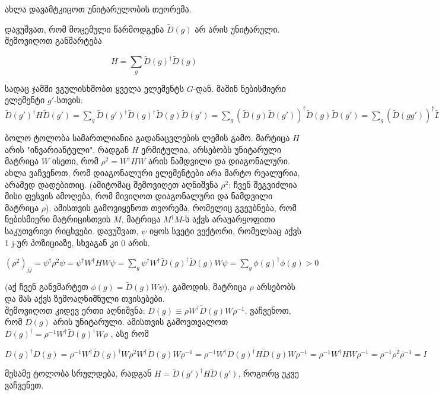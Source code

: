 \documentclass[12pt]{article}
\begin{document}
\begin{sloppypar}
ახლა დავამტკიცოთ უნიტარულობის თეორემა. 

დავუშვათ, რომ მოცემული წარმოდგენა $\widetilde D(g)$ არ არის უნიტარული. შემოვიღოთ განმარტება 

$$H = \sum_{g} \widetilde D(g)^{\dagger} \widetilde D(g) $$

\sloppy სადაც ჯამში ვგულისხმობთ ყველა ელემენტს $G$-დან. მაშინ ნებისმიერი ელემენტი $g'$-სთვის: 
$
 \widetilde D(g')^{\dagger} H \widetilde D(g') = 
 \sum_{g} \widetilde D(g')^{\dagger} \widetilde D(g)^{\dagger} \widetilde D(g) \widetilde D(g') = 
 \sum_{g} (\widetilde D(g) \widetilde D(g') )^{\dagger} \widetilde D(
 g) \widetilde D(g') =
 \sum_{g} (\widetilde D(gg') )^{\dagger} \widetilde D(gg') = H
$

ბოლო ტოლობა სამართლიანია გადანაცვლების ლემის გამო. მარტიცა $H$ არის "ინვარიანტული".
რადგან $H$ ერმიტულია, არსებობს უნიტარული მატრიცა $W$ ისეთი, რომ $\rho^2=W^{\dagger}HW$ არის ნამდვილი და დიაგონალური. ახლა ვაჩვენოთ, რომ დიაგონალური ელემენტები არა მარტო რეალურია, არამედ დადებითიც. (ამიტომაც შემოვიღეთ აღნიშვნა $\rho^2$: ჩვენ შეგვიძლია მისი ფესვის ამოღება, რომ მივიღოთ დიაგონალური და ნამდვილი მატრიცა $\rho$). ამისთვის გამოვიყენოთ თეორემა, რომელიც გვეუბნება, რომ ნებისმიერი მატრიცისთვის $M$, მატრიცა $M^{\dagger}M$-ს აქვს არაუარყოფითი საკუთვრივი რიცხვები. დავუშვათ, $\psi$ იყოს სვეტი ვექტორი, რომელსაც აქვს 1 j-ურ პოზიციაზე, სხვაგან კი 0 არის.

$
 (\rho^2)_{jj} = 
 \psi^{\dagger} \rho^2 \psi =
 \psi^{\dagger} W^{\dagger}HW \psi = 
 \sum_{g} \psi^{\dagger} W^{\dagger}  \widetilde D(g)^{\dagger} \widetilde D(g) W \psi = 
 \sum_{g} \phi(g)^{\dagger} \phi(g) > 0
$


(აქ ჩვენ განვმარტეთ $\phi(g) = \widetilde D(g) W \psi$). გამოდის, მატრიცა $\rho$ არსებობს და მას აქვს ზემოაღნიშნული თვისებები.\\

შემოვიღოთ კიდევ ერთი აღნიშვნა: $D(g) \equiv \rho W^{\dagger} \widetilde D(g) W \rho^{-1}$. ვაჩვენოთ, რომ $D(g)$ არის უნიტარული. ამისთვის გამოვთვალოთ 
$D(g)^{\dagger}= \rho^{-1} W^{\dagger} \widetilde D(g)^{\dagger} W \rho$
, ასე რომ

$
 D(g)^{\dagger}D(g) = 
 \rho^{-1} W^{\dagger} \widetilde D(g)^{\dagger} W \rho^2 
 W^{\dagger} \widetilde D(g) W \rho^{-1} = 
 \rho^{-1} W^{\dagger} \widetilde D(g)^{\dagger} H \widetilde D(g) W \rho^{-1} = 
 \rho^{-1} W^{\dagger} H W \rho^{-1} = 
 \rho^{-1} \rho^{2} \rho^{-1} = 
 I
$

მესამე ტოლობა სრულდება, რადგან $H = \widetilde D(g')^{\dagger} H \widetilde D(g')$, როგორც უკვე ვაჩვენეთ. \\


\end{sloppypar}
\end{document}
